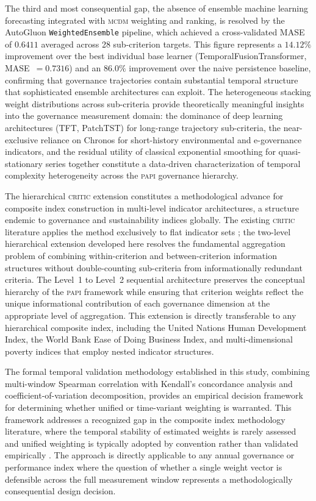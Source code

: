 \documentclass[12pt,a4paper]{article}
\newcommand{\PAPI}{\textsc{papi}\xspace}
\newcommand{\MCDM}{\textsc{mcdm}\xspace}
\newcommand{\CRITIC}{\textsc{critic}\xspace}
\begin{document}
The third and most consequential gap, the absence of ensemble machine learning forecasting integrated with \MCDM weighting and ranking, is resolved by the AutoGluon \texttt{WeightedEnsemble} pipeline, which achieved a cross-validated MASE of $0.6411$ averaged across 28 sub-criterion targets. This figure represents a $14.12\%$ improvement over the best individual base learner (TemporalFusionTransformer, MASE~$= 0.7316$) and an $86.0\%$ improvement over the naive persistence baseline, confirming that governance trajectories contain substantial temporal structure that sophisticated ensemble architectures can exploit. The heterogeneous stacking weight distributions across sub-criteria provide theoretically meaningful insights into the governance measurement domain: the dominance of deep learning architectures (TFT, PatchTST) for long-range trajectory sub-criteria, the near-exclusive reliance on Chronos for short-history environmental and e-governance indicators, and the residual utility of classical exponential smoothing for quasi-stationary series together constitute a data-driven characterization of temporal complexity heterogeneity across the \PAPI governance hierarchy.

The hierarchical \CRITIC extension constitutes a methodological advance for composite index construction in multi-level indicator architectures, a structure endemic to governance and sustainability indices globally. The existing \CRITIC literature applies the method exclusively to flat indicator sets \citep{Diakoulaki1995}; the two-level hierarchical extension developed here resolves the fundamental aggregation problem of combining within-criterion and between-criterion information structures without double-counting sub-criteria from informationally redundant criteria. The Level~1 to Level~2 sequential architecture preserves the conceptual hierarchy of the \PAPI framework while ensuring that criterion weights reflect the unique informational contribution of each governance dimension at the appropriate level of aggregation. This extension is directly transferable to any hierarchical composite index, including the United Nations Human Development Index, the World Bank Ease of Doing Business Index, and multi-dimensional poverty indices that employ nested indicator structures.

The formal temporal validation methodology established in this study, combining multi-window Spearman correlation with Kendall's concordance analysis and coefficient-of-variation decomposition, provides an empirical decision framework for determining whether unified or time-variant weighting is warranted. This framework addresses a recognized gap in the composite index methodology literature, where the temporal stability of estimated weights is rarely assessed and unified weighting is typically adopted by convention rather than validated empirically \citep{Seth2018, Liborio2024}. The approach is directly applicable to any annual governance or performance index where the question of whether a single weight vector is defensible across the full measurement window represents a methodologically consequential design decision.
\end{document}
